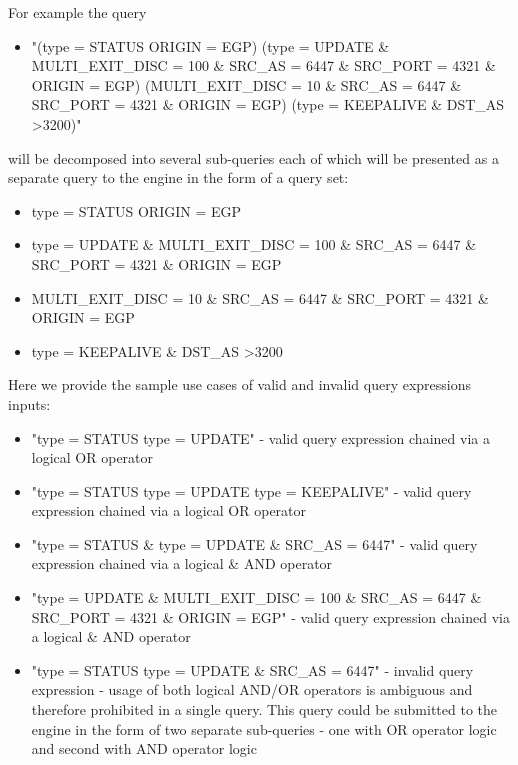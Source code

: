 \documentclass[11pt]{article} %
\begin{document}
For example the query 

\begin{itemize}

\item{ "(type = STATUS \textbar \space ORIGIN = EGP) \textbar \space (type = UPDATE \& MULTI\_EXIT\_DISC = 100 \& SRC\_AS = 6447 \& SRC\_PORT = 4321 \& ORIGIN = EGP) \textbar \space (MULTI\_EXIT\_DISC = 10 \& SRC\_AS = 6447 \& SRC\_PORT = 4321 \& ORIGIN = EGP) \textbar \space (type = KEEPALIVE \& DST\_AS \textgreater 3200)" }

\end{itemize}

will be decomposed into several sub-queries each of which will be presented as a separate query to the engine in the form of a query set:

\begin{itemize}

\item{type = STATUS \textbar \space ORIGIN = EGP}

\item{type = UPDATE \& MULTI\_EXIT\_DISC = 100 \& SRC\_AS = 6447 \& SRC\_PORT = 4321 \& ORIGIN = EGP}

\item{MULTI\_EXIT\_DISC = 10 \& SRC\_AS = 6447 \& SRC\_PORT = 4321 \& ORIGIN = EGP}

\item{type = KEEPALIVE \& DST\_AS \textgreater 3200}

\end{itemize}

Here we provide the sample use cases of valid and invalid query expressions inputs:

\begin{itemize}

\item{"type = STATUS \textbar \space type = UPDATE" - valid query expression
chained via  a logical \textbar \space OR operator}

\item{"type = STATUS \textbar \space type = UPDATE \textbar \space type =
KEEPALIVE" - valid query expression chained via  a logical \textbar \space OR
operator}


\item{"type = STATUS \& \space type = UPDATE \& SRC\_AS = 6447" - valid query
expression chained via  a logical \& \space AND operator}

\item{"type = UPDATE \& MULTI\_EXIT\_DISC = 100 \& SRC\_AS = 6447 \& SRC\_PORT =
4321 \& ORIGIN = EGP" - valid query expression chained via a logical \& \space
AND operator }


\item{"type = STATUS \textbar \space type = UPDATE \& SRC\_AS = 6447" - invalid query expression - usage of both logical AND/OR operators is ambiguous and therefore prohibited in a single query. This query could be submitted to the engine in the form of two separate sub-queries - one with OR operator logic and second with AND operator logic}

\end{itemize}
\end{document}
